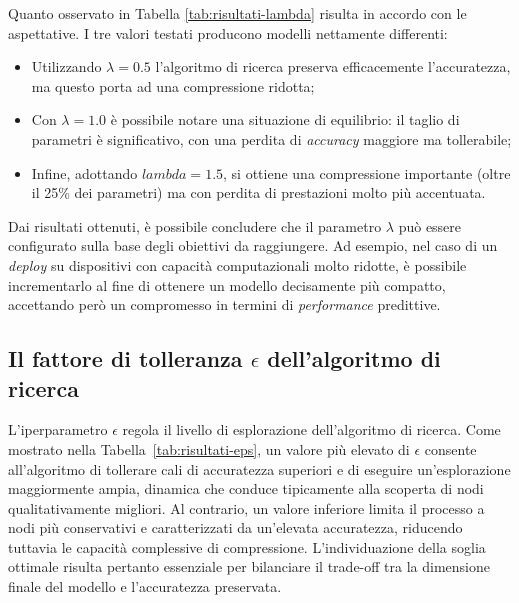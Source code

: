 Quanto osservato in Tabella \ref{tab:risultati-lambda} risulta in accordo con
le aspettative. I tre valori testati producono modelli nettamente differenti:
\begin{itemize}
    \item Utilizzando $\lambda=0.5$ l'algoritmo di ricerca preserva efficacemente
          l'accuratezza, ma questo porta ad una compressione ridotta;
    \item Con $\lambda=1.0$ è possibile notare una situazione di equilibrio: il taglio di
          parametri è significativo, con una perdita di \textit{accuracy} maggiore ma
          tollerabile;
    \item Infine, adottando $lambda=1.5$, si ottiene una compressione importante (oltre
          il 25\% dei parametri) ma con perdita di prestazioni molto più accentuata.
\end{itemize}
Dai risultati ottenuti, è possibile concludere che il parametro $\lambda$ può essere configurato sulla base degli obiettivi da raggiungere. Ad esempio, nel caso di un \textit{deploy} su dispositivi con capacità computazionali molto ridotte, è possibile incrementarlo al fine di ottenere un modello decisamente più compatto, accettando però un compromesso in termini di \textit{performance} predittive.

\subsection{Il fattore di tolleranza $\epsilon$ dell'algoritmo di ricerca}
L'iperparametro $\epsilon$ regola il livello di esplorazione dell'algoritmo di ricerca. Come mostrato nella Tabella~\ref{tab:risultati-eps}, un valore più elevato di $\epsilon$ consente all'algoritmo di tollerare cali di accuratezza superiori e di eseguire un'esplorazione maggiormente ampia, dinamica che conduce tipicamente alla scoperta di nodi qualitativamente migliori. Al contrario, un valore inferiore limita il processo a nodi più conservativi e caratterizzati da un'elevata accuratezza, riducendo tuttavia le capacità complessive di compressione. L'individuazione della soglia ottimale risulta pertanto essenziale per bilanciare il trade-off tra la dimensione finale del modello e l'accuratezza preservata.

